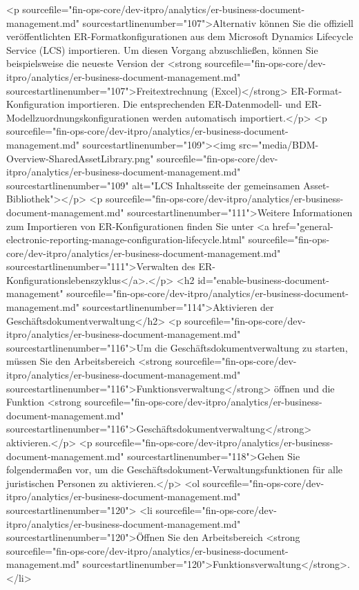 <p sourcefile="fin-ops-core/dev-itpro/analytics/er-business-document-management.md" sourcestartlinenumber="107">Alternativ können Sie die offiziell veröffentlichten ER-Formatkonfigurationen aus dem Microsoft Dynamics Lifecycle Service (LCS) importieren. Um diesen Vorgang abzuschließen, können Sie beispielsweise die neueste Version der <strong sourcefile="fin-ops-core/dev-itpro/analytics/er-business-document-management.md" sourcestartlinenumber="107">Freitextrechnung (Excel)</strong> ER-Format-Konfiguration importieren. Die entsprechenden ER-Datenmodell- und ER-Modellzuordnungskonfigurationen werden automatisch importiert.</p>
<p sourcefile="fin-ops-core/dev-itpro/analytics/er-business-document-management.md" sourcestartlinenumber="109"><img src="media/BDM-Overview-SharedAssetLibrary.png" sourcefile="fin-ops-core/dev-itpro/analytics/er-business-document-management.md" sourcestartlinenumber="109" alt="LCS Inhaltsseite der gemeinsamen Asset-Bibliothek"></p>
<p sourcefile="fin-ops-core/dev-itpro/analytics/er-business-document-management.md" sourcestartlinenumber="111">Weitere Informationen zum Importieren von ER-Konfigurationen finden Sie unter <a href="general-electronic-reporting-manage-configuration-lifecycle.html" sourcefile="fin-ops-core/dev-itpro/analytics/er-business-document-management.md" sourcestartlinenumber="111">Verwalten des ER-Konfigurationslebenszyklus</a>.</p>
<h2 id="enable-business-document-management" sourcefile="fin-ops-core/dev-itpro/analytics/er-business-document-management.md" sourcestartlinenumber="114">Aktivieren der Geschäftsdokumentverwaltung</h2>
<p sourcefile="fin-ops-core/dev-itpro/analytics/er-business-document-management.md" sourcestartlinenumber="116">Um die Geschäftsdokumentverwaltung zu starten, müssen Sie den Arbeitsbereich <strong sourcefile="fin-ops-core/dev-itpro/analytics/er-business-document-management.md" sourcestartlinenumber="116">Funktionsverwaltung</strong> öffnen und die Funktion <strong sourcefile="fin-ops-core/dev-itpro/analytics/er-business-document-management.md" sourcestartlinenumber="116">Geschäftsdokumentverwaltung</strong> aktivieren.</p>
<p sourcefile="fin-ops-core/dev-itpro/analytics/er-business-document-management.md" sourcestartlinenumber="118">Gehen Sie folgendermaßen vor, um die Geschäftsdokument-Verwaltungsfunktionen für alle juristischen Personen zu aktivieren.</p>
<ol sourcefile="fin-ops-core/dev-itpro/analytics/er-business-document-management.md" sourcestartlinenumber="120">
<li sourcefile="fin-ops-core/dev-itpro/analytics/er-business-document-management.md" sourcestartlinenumber="120">Öffnen Sie den Arbeitsbereich <strong sourcefile="fin-ops-core/dev-itpro/analytics/er-business-document-management.md" sourcestartlinenumber="120">Funktionsverwaltung</strong>.</li>
